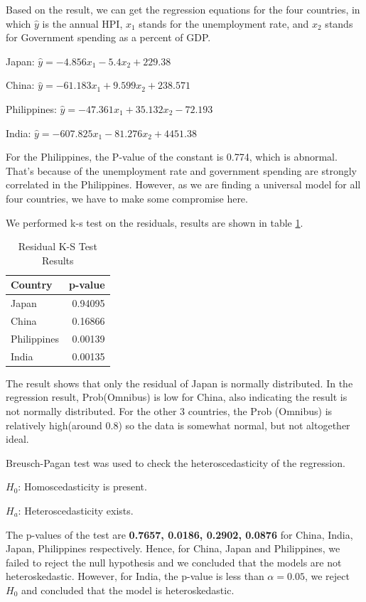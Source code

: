 \documentclass[11pt]{article}
\begin{document}
Based on the result, we can get the regression equations for the four countries, in which ${\hat y}$ is the annual HPI, $x_1$ stands for the unemployment rate, and $x_2$ stands for Government spending as a percent of GDP.

Japan: ${\hat y} = -4.856x_1 -5.4x_2 + 229.38$

China: ${\hat y} = -61.183x_1 +9.599x_2 + 238.571$

Philippines: ${\hat y} = -47.361x_1 +35.132x_2 - 72.193$

India: ${\hat y} = -607.825x_1 -81.276x_2 + 4451.38$

For the Philippines, the P-value of the constant is 0.774, which is abnormal. That's because of the unemployment rate and government spending are strongly correlated in the Philippines. However, as we are finding a universal model for all four countries, we have to make some compromise here.

We performed k-s test on the residuals, results are shown in table \ref{tab:residualks_results}.

\begin{table}[H]
\centering
\begin{tabular}{|l|r|}
\hline
Country     & p-value \\ \hline
Japan       & 0.94095 \\ \hline
China       & 0.16866 \\ \hline
Philippines & 0.00139 \\ \hline
India       & 0.00135 \\ \hline
\end{tabular}
\caption{Residual K-S Test Results}
\label{tab:residualks_results}
\end{table}

The result shows that only the residual of Japan is normally distributed. In the regression result, Prob(Omnibus) is low for China, also indicating the result is not normally distributed. For the other 3 countries, the Prob (Omnibus) is relatively high(around 0.8) so the data is somewhat normal, but not altogether ideal.

Breusch-Pagan test was used to check the heteroscedasticity of the regression.

$H_0$: Homoscedasticity is present.

$H_a$: Heteroscedasticity exists.

The p-values of the test are \textbf{0.7657, 0.0186, 0.2902, 0.0876} for China, India, Japan, Philippines respectively. Hence, for China, Japan and Philippines, we failed to reject the null hypothesis and we concluded that the models are not heteroskedastic. However, for India, the p-value is less than $\alpha=0.05$, we reject $H_0$ and concluded that the model is heteroskedastic.
\end{document}
